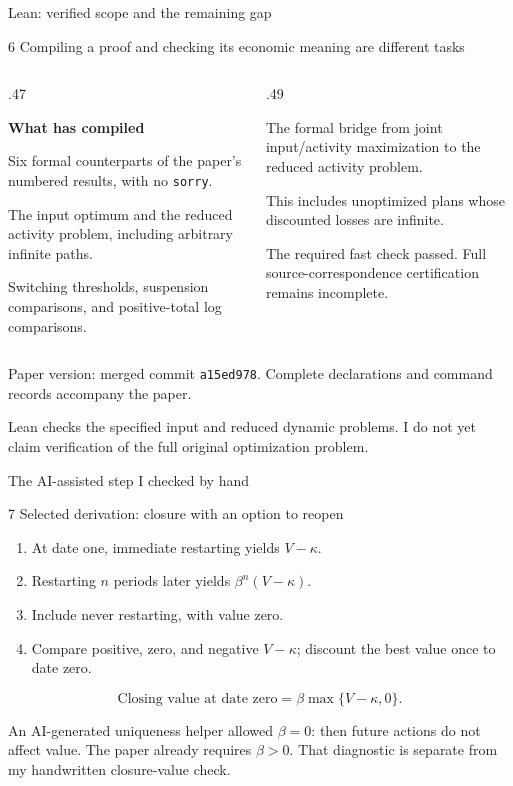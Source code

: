 \documentclass[aspectratio=169,11pt]{beamer}
\newcommand{\kwOrange}[1]{{\color{orange}#1}}
\newcommand{\kwTurq}[1]{{\color{turquoise}#1}}
\newcommand{\labeltext}[1]{\par{\small\bfseries\color{blue}#1\par}\vspace{1.5mm}}
\newcommand{\takeaway}[1]{\par\vspace{2.5mm}\begingroup\setlength{\fboxsep}{2.5mm}\colorbox{pale}{\begin{minipage}{\dimexpr\linewidth-5mm\relax}\small\raggedright #1\end{minipage}}\endgroup\par}
\newcommand{\sectiontag}[1]{{\scriptsize\color{muted}#1\par}\vspace{2mm}}
\begin{document}
\begin{frame}{Lean: \kwTurq{verified scope} and the remaining gap}
\sectiontag{6 \textperiodcentered{} Compiling a proof and checking its economic meaning are different tasks}
\begin{columns}[T,onlytextwidth]
\begin{column}{.47\textwidth}
\labeltext{What has compiled}
\small Six formal counterparts of the paper's numbered results, with no \texttt{sorry}.\par\vspace{4mm}
The input optimum and the reduced activity problem, including arbitrary infinite paths.\par\vspace{4mm}
Switching thresholds, suspension comparisons, and positive-total log comparisons.
\end{column}
\begin{column}{.49\textwidth}
\labeltext{\kwOrange{What remains open}}
\small The formal bridge from joint input/activity maximization to the reduced activity problem.\par\vspace{4mm}
This includes unoptimized plans whose discounted losses are infinite.\par\vspace{4mm}
The required fast check passed. Full source-correspondence certification remains incomplete.
\end{column}
\end{columns}
\vspace{4mm}
{\scriptsize\color{muted}Paper version: merged commit \texttt{a15ed978}. Complete declarations and command records accompany the paper.}
\takeaway{Lean checks the specified input and reduced dynamic problems. I do not yet claim verification of the full original optimization problem.}
\end{frame}

\begin{frame}{The AI-assisted step I \kwOrange{checked by hand}}

\sectiontag{7 \textperiodcentered{} Selected derivation: closure with an option to reopen}
\begin{enumerate}
\item At date one, immediate restarting yields $V-\kappa$.
\vspace{2mm}\item Restarting $n$ periods later yields $\beta^n(V-\kappa)$.
\vspace{2mm}\item Include never restarting, with value zero.
\vspace{2mm}\item Compare positive, zero, and negative $V-\kappa$; discount the best value once to date zero.
\end{enumerate}
\vspace{3mm}\[\boxed{\text{Closing value at date zero}=\beta\max\{V-\kappa,0\}.}\]
\takeaway{An AI-generated uniqueness helper allowed $\beta=0$: then future actions do not affect value. The paper already requires $\beta>0$. That diagnostic is separate from my handwritten closure-value check.}

\end{frame}
\end{document}

